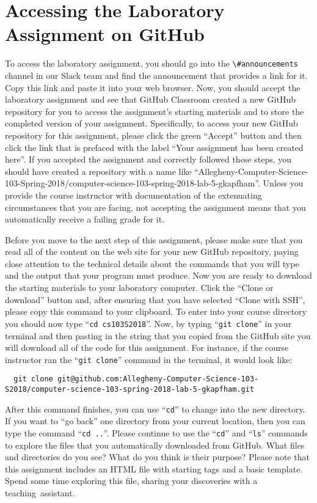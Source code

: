 \documentclass[11pt]{article}
\newcommand{\command}[1]{``\lstinline{#1}''}
\newcommand{\channel}[1]{\lstinline{#1}}
\newcommand{\step}[1]{``{#1}''}
\begin{document}
\section*{Accessing the Laboratory Assignment on GitHub}

To access the laboratory assignment, you should go into the
\channel{\#announcements} channel in our Slack team and find the announcement
that provides a link for it. Copy this link and paste it into your web browser.
Now, you should accept the laboratory assignment and see that GitHub Classroom
created a new GitHub repository for you to access the assignment's starting
materials and to store the completed version of your assignment. Specifically,
to access your new GitHub repository for this assignment, please click the green
``Accept'' button and then click the link that is prefaced with the label ``Your
assignment has been created here''. If you accepted the assignment and correctly
followed these steps, you should have created a repository with a name like
``Allegheny-Computer-Science-103-Spring-2018/computer-science-103-spring-2018-lab-5-gkapfham''.
Unless you provide the course instructor with documentation of the extenuating
circumstances that you are facing, not accepting the assignment means that you
automatically receive a failing grade for it.

Before you move to the next step of this assignment, please make sure that you
read all of the content on the web site for your new GitHub repository, paying
close attention to the technical details about the commands that you will type
and the output that your program must produce. Now you are ready to download the
starting materials to your laboratory computer. Click the ``Clone or download''
button and, after ensuring that you have selected ``Clone with SSH'', please
copy this command to your clipboard. To enter into your course directory you
should now type \command{cd cs103S2018}. Now, by typing \command{git clone} in
your terminal and then pasting in the string that you copied from the GitHub
site you will download all of the code for this assignment. For instance, if the
course instructor ran the \command{git clone} command in the terminal, it would
look like:

\begin{lstlisting}
  git clone git@github.com:Allegheny-Computer-Science-103-S2018/computer-science-103-spring-2018-lab-5-gkapfham.git
\end{lstlisting}

After this command finishes, you can use \command{cd} to change into the new
directory. If you want to \step{go back} one directory from your current
location, then you can type the command \command{cd ..}. Please continue to use
the \command{cd} and \command{ls} commands to explore the files that you
automatically downloaded from GitHub. What files and directories do you see?
What do you think is their purpose? Please note that this assignment includes an
HTML file with starting tags and a basic template. Spend some time exploring
this file, sharing your discoveries with a \mbox{teaching assistant}.
\end{document}
